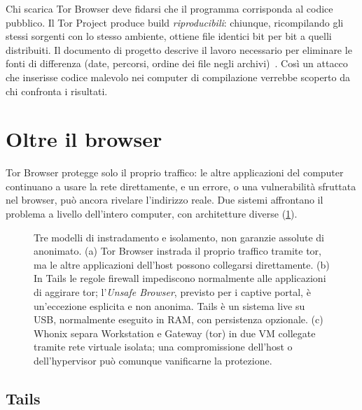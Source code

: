 \begin{approfondimento}
Chi scarica Tor Browser deve fidarsi che il programma corrisponda al codice pubblico. Il Tor Project produce build \emph{riproducibili}: chiunque, ricompilando gli stessi sorgenti con lo stesso ambiente, ottiene file identici bit per bit a quelli distribuiti. Il documento di progetto descrive il lavoro necessario per eliminare le fonti di differenza (date, percorsi, ordine dei file negli archivi)~\cite{perry2018torbrowser}. Così un attacco che inserisse codice malevolo nei computer di compilazione verrebbe scoperto da chi confronta i risultati.
\end{approfondimento}

\section{Oltre il browser}\label{sec:browser-sistemi}

Tor Browser protegge solo il proprio traffico: le altre applicazioni del computer continuano a usare la rete direttamente, e un errore, o una vulnerabilità sfruttata nel browser, può ancora rivelare l'indirizzo reale. Due sistemi affrontano il problema a livello dell'intero computer, con architetture diverse (\cref{fig:architetture}).

\begin{figure}[htbp]
\centering

\caption{Tre modelli di instradamento e isolamento, non garanzie assolute di anonimato. (a) Tor Browser instrada il proprio traffico tramite tor, ma le altre applicazioni dell'host possono collegarsi direttamente. (b) In Tails le regole firewall impediscono normalmente alle applicazioni di aggirare tor; l'\emph{Unsafe Browser}, previsto per i captive portal, è un'eccezione esplicita e non anonima. Tails è un sistema live su USB, normalmente eseguito in RAM, con persistenza opzionale. (c) Whonix separa Workstation e Gateway (tor) in due VM collegate tramite rete virtuale isolata; una compromissione dell'host o dell'hypervisor può comunque vanificarne la protezione.}
\label{fig:architetture}
\end{figure}

\subsection{Tails}

